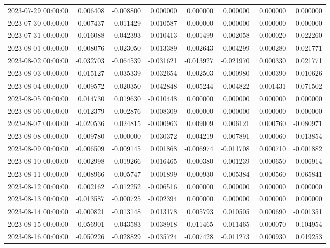 \begin{tabular}{lrrrrrrr}
2023-07-29 00:00:00 & 0.006408 & -0.008800 & 0.000000 & 0.000000 & 0.000000 & 0.000000 & 0.000000 \\
2023-07-30 00:00:00 & -0.007437 & -0.011429 & -0.010587 & 0.000000 & 0.000000 & 0.000000 & 0.000000 \\
2023-07-31 00:00:00 & -0.016088 & -0.042393 & -0.010413 & 0.001499 & 0.002058 & -0.000020 & 0.022260 \\
2023-08-01 00:00:00 & 0.008076 & 0.023050 & 0.013389 & -0.002643 & -0.004299 & 0.000280 & 0.021771 \\
2023-08-02 00:00:00 & -0.032703 & -0.064539 & -0.031621 & -0.013927 & -0.021970 & 0.000330 & 0.021771 \\
2023-08-03 00:00:00 & -0.015127 & -0.035339 & -0.032654 & -0.002503 & -0.000980 & 0.000390 & -0.010626 \\
2023-08-04 00:00:00 & -0.009572 & -0.020350 & -0.042848 & -0.005244 & -0.004822 & -0.001431 & 0.071502 \\
2023-08-05 00:00:00 & 0.014730 & 0.019630 & -0.010448 & 0.000000 & 0.000000 & 0.000000 & 0.000000 \\
2023-08-06 00:00:00 & 0.012379 & 0.002876 & -0.008309 & 0.000000 & 0.000000 & 0.000000 & 0.000000 \\
2023-08-07 00:00:00 & -0.020536 & 0.024815 & -0.000963 & 0.009009 & 0.006121 & 0.000760 & -0.080971 \\
2023-08-08 00:00:00 & 0.009780 & 0.000000 & 0.030372 & -0.004219 & -0.007891 & 0.000060 & 0.013854 \\
2023-08-09 00:00:00 & -0.006509 & -0.009145 & 0.001868 & -0.006974 & -0.011708 & 0.000710 & -0.001882 \\
2023-08-10 00:00:00 & -0.002998 & -0.019266 & -0.016465 & 0.000380 & 0.001239 & -0.000650 & -0.006914 \\
2023-08-11 00:00:00 & 0.008966 & 0.005747 & -0.001899 & -0.000930 & -0.005384 & 0.000560 & -0.065841 \\
2023-08-12 00:00:00 & 0.002162 & -0.012252 & -0.006516 & 0.000000 & 0.000000 & 0.000000 & 0.000000 \\
2023-08-13 00:00:00 & -0.013587 & -0.000725 & -0.002394 & 0.000000 & 0.000000 & 0.000000 & 0.000000 \\
2023-08-14 00:00:00 & -0.000821 & -0.013148 & 0.013178 & 0.005793 & 0.010505 & 0.000690 & -0.001351 \\
2023-08-15 00:00:00 & -0.056901 & -0.043583 & -0.038918 & -0.011465 & -0.011465 & -0.000070 & 0.104954 \\
2023-08-16 00:00:00 & -0.050226 & -0.028829 & -0.035724 & -0.007428 & -0.011273 & 0.000930 & 0.019253 \\

\end{tabular}
